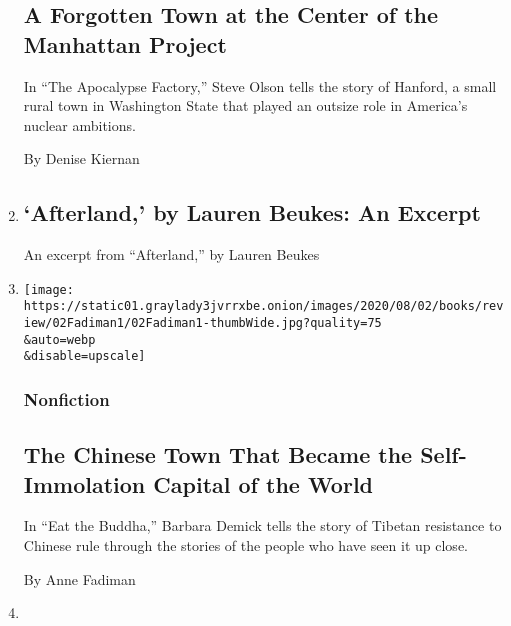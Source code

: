 \begin{enumerate}
{  \subsection{A Forgotten Town at the Center of the Manhattan
  Project}\label{a-forgotten-town-at-the-center-of-the-manhattan-project}}

  In ``The Apocalypse Factory,'' Steve Olson tells the story of Hanford,
  a small rural town in Washington State that played an outsize role in
  America's nuclear ambitions.

  By Denise Kiernan
\item
  \href{/2020/07/28/books/review/afterland-by-lauren-beukes-an-excerpt.html}{}

  \hypertarget{afterland-by-lauren-beukes-an-excerpt}{%
  \subsection{`Afterland,' by Lauren Beukes: An
  Excerpt}\label{afterland-by-lauren-beukes-an-excerpt}}

  An excerpt from ``Afterland,'' by Lauren Beukes
\item
  \href{/2020/07/28/books/review/eat-the-buddha-barbara-demick.html}{}

  \texttt{[image: https://static01.graylady3jvrrxbe.onion/images/2020/08/02/books/review/02Fadiman1/02Fadiman1-thumbWide.jpg?quality=75\\\&auto=webp\\\&disable=upscale]}

  \hypertarget{nonfiction-3}{%
  \subsubsection{Nonfiction}\label{nonfiction-3}}

  \hypertarget{the-chinese-town-that-became-the-self-immolation-capital-of-the-world}{%
  \subsection{The Chinese Town That Became the Self-Immolation Capital
  of the
  World}\label{the-chinese-town-that-became-the-self-immolation-capital-of-the-world}}

  In ``Eat the Buddha,'' Barbara Demick tells the story of Tibetan
  resistance to Chinese rule through the stories of the people who have
  seen it up close.

  By Anne Fadiman
\item
  \href{/2020/07/28/books/review/aimee-bender-the-butterfly-lampshade.html}{}


\end{enumerate}
